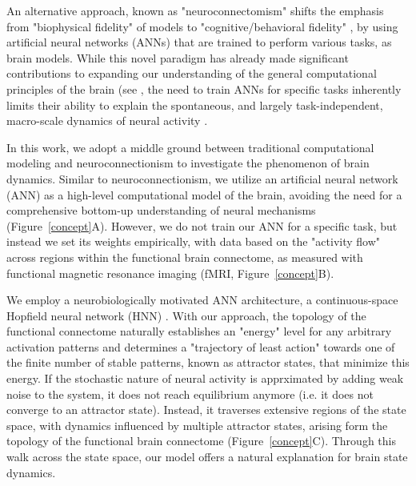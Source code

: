 \documentclass{article}
\begin{document}
An alternative approach, known as "neuroconnectomism" \citep{doerig2023neuroconnectionist} shifts the
emphasis from "biophysical fidelity" of models to "cognitive/behavioral fidelity"
\citep{kriegeskorte2018cognitive}, by using artificial neural networks (ANNs) that are trained to
perform various tasks, as brain models.
While this novel paradigm has already made significant contributions to expanding our understanding of the general
computational principles of the brain (see \citep{doerig2023neuroconnectionist}, the need to train ANNs for
specific tasks inherently limits their ability to explain the spontaneous, and largely task-independent, macro-scale
dynamics of neural activity \citep{richards2019deep}.

In this work, we adopt a middle ground between traditional computational modeling and neuroconnectionism to investigate
the phenomenon of brain dynamics.
Similar to neuroconnectionism, we utilize an artificial neural network (ANN) as a high-level computational model of the brain, avoiding the need for a comprehensive bottom-up understanding of neural mechanisms (Figure~\ref{concept}A).
However, we do not train our ANN for a specific task, but instead we set its weights empirically, with data based
on the "activity flow" \citep{cole2016activity, ito2017cognitive}
across regions within the functional brain connectome, as measured with functional magnetic resonance imaging
(fMRI, Figure~\ref{concept}B).

We employ a neurobiologically motivated ANN architecture, a continuous-space Hopfield neural network (HNN) \citep{hopfield1982neural, krotov2023new}.
With our approach, the topology of the functional connectome naturally establishes an "energy" level for any
arbitrary activation patterns and determines a "trajectory of least action" towards one of the finite number of stable patterns, known as
attractor states, that minimize this energy.
If the stochastic nature of neural activity is apprximated by adding weak noise to the system, it does not reach equilibrium anymore (i.e. it does not converge to an attractor state).
Instead, it traverses extensive regions of the state space, with dynamics influenced by multiple attractor states,
arising form the topology of the functional brain connectome (Figure~\ref{concept}C).
Through this walk across the state space, our model offers a natural explanation for brain state dynamics.
\end{document}
